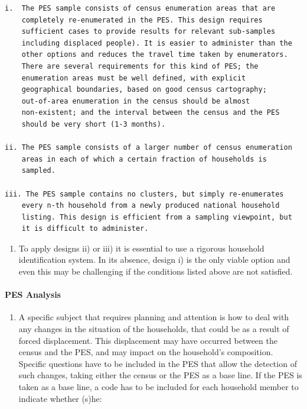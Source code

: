 \documentclass[
]{article}
\providecommand{\tightlist}{%
  \setlength{\itemsep}{0pt}\setlength{\parskip}{0pt}}
\begin{document}
\begin{verbatim}
i.  The PES sample consists of census enumeration areas that are
    completely re-enumerated in the PES. This design requires
    sufficient cases to provide results for relevant sub-samples
    including displaced people). It is easier to administer than the
    other options and reduces the travel time taken by enumerators.
    There are several requirements for this kind of PES; the
    enumeration areas must be well defined, with explicit
    geographical boundaries, based on good census cartography;
    out-of-area enumeration in the census should be almost
    non-existent; and the interval between the census and the PES
    should be very short (1-3 months).

ii. The PES sample consists of a larger number of census enumeration
    areas in each of which a certain fraction of households is
    sampled.

iii. The PES sample contains no clusters, but simply re-enumerates
    every n-th household from a newly produced national household
    listing. This design is efficient from a sampling viewpoint, but
    it is difficult to administer.
\end{verbatim}

\begin{enumerate}
\def\labelenumi{\arabic{enumi}.}
\setcounter{enumi}{113}
\tightlist
\item
  To apply designs ii) or iii) it is essential to use a rigorous
  household identification system. In its absence, design i) is the
  only viable option and even this may be challenging if the
  conditions listed above are not satisfied.
\end{enumerate}

\hypertarget{a.3.-pes-analysis}{%
\paragraph{PES Analysis}\label{a.3.-pes-analysis}}

\begin{enumerate}
\def\labelenumi{\arabic{enumi}.}
\setcounter{enumi}{114}
\tightlist
\item
  A specific subject that requires planning and attention is how to
  deal with any changes in the situation of the households, that could
  be as a result of forced displacement. This displacement may have
  occurred between the census and the PES, and may impact on the
  household's composition. Specific questions have to be included in
  the PES that allow the detection of such changes, taking either the
  census or the PES as a base line. If the PES is taken as a base
  line, a code has to be included for each household member to
  indicate whether (s)he:
\end{enumerate}
\end{document}
